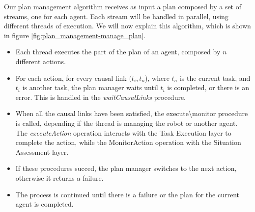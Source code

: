 Our plan management algorithm receives as input a plan composed by a set of streams, one for each agent. Each stream will be handled in parallel, using different threads of execution. We will now explain this algorithm, which is shown in figure \ref{fig:plan_management-manage_plan}.
\begin{itemize}
  \item Each thread executes the part of the plan of an agent, composed by $n$ different actions.
  \item For each action, for every causal link $(t_i,t_n$), where $t_n$ is the current task, and $t_i$ is another task, the plan manager waits until $t_i$ is completed, or there is an error. This is handled in the \textit{waitCausalLinks} procedure.
  \item When all the causal links have been satisfied, the execute\textbackslash monitor procedure is called, depending if the thread is managing the robot or another agent. The \textit{executeAction} operation interacts with the Task Execution layer to complete the action, while the MonitorAction operation with the Situation Assessment layer.
  \item If these procedures succed, the plan manager switches to the next action, otherwise it returns a failure.
  \item The process is continued until there is a failure or the plan for the current agent is completed.
\end{itemize} 

